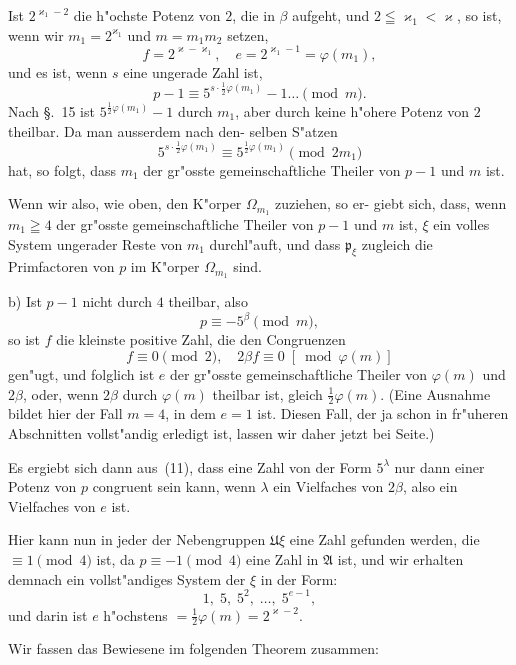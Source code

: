 \documentclass[12pt,a4paper]{article}
\theoremstyle{weber}
\begin{document}
Ist $2^{\varkappa_1-2}$ die h"ochste Potenz von $2$, die in $\beta$ aufgeht, und
$2 \leqq \varkappa_1 < \varkappa$, so ist, wenn wir $m_1 = 2^{\varkappa_1}$ und $m = m_1m_2$ setzen,
\[
f = 2^{\varkappa-\varkappa_1}, \quad e = 2^{\varkappa_1-1} = \varphi(m_1),
\]
und es ist, wenn $s$ eine ungerade Zahl ist,
\[
p - 1 \equiv 5^{s\cdot\frac{1}{2}\varphi(m_1)} - 1 \dots \pmod{m}.
\]
Nach \S.~15 ist $5^{\frac{1}{2}\varphi(m_1)} - 1$ durch $m_1$, aber durch keine
h"ohere Potenz von $2$ theilbar. Da man ausserdem nach den-
selben S"atzen
\[
5^{s\cdot\frac{1}{2}\varphi(m_1)} \equiv 5^{\frac{1}{2}\varphi(m_1)} \pmod{2m_1}
\]
hat, so folgt, dass $m_1$ der gr"osste gemeinschaftliche Theiler von
$p - 1$ und $m$ ist.

Wenn wir also, wie oben, den K"orper $\varOmega_{m_1}$ zuziehen, so er-
giebt sich, dass, wenn $m_1 \geqq 4$ der gr"osste gemeinschaftliche
Theiler von $p - 1$ und $m$ ist, $\xi$ ein volles System ungerader
Reste von $m_1$ durchl"auft, und dass $\mathfrak{p}_\xi$ zugleich die Primfactoren
von $p$ im K"orper $\varOmega_{m_1}$ sind.

b) Ist $p - 1$ nicht durch $4$ theilbar, also
\begin{equation}\label{eq:s172-11}
p \equiv -5^\beta \pmod{m},
\end{equation}
so ist $f$ die kleinste positive Zahl, die den Congruenzen
\[
f \equiv 0 \pmod{2}, \quad 2\beta f \equiv 0 \;\left[\bmod \varphi(m)\right]
\]
gen"ugt, und folglich ist $e$ der gr"osste gemeinschaftliche Theiler
von $\varphi(m)$ und $2\beta$, oder, wenn $2\beta$ durch $\varphi(m)$ theilbar ist,
gleich $\tfrac{1}{2}\varphi(m)$. (Eine Ausnahme bildet hier der Fall $m = 4$, in
dem $e = 1$ ist. Diesen Fall, der ja schon in fr"uheren Abschnitten
vollst"andig erledigt ist, lassen wir daher jetzt bei Seite.)

Es ergiebt sich dann aus~(11), dass eine Zahl von der Form $5^\lambda$
nur dann einer Potenz von $p$ congruent sein kann, wenn $\lambda$ ein
Vielfaches von $2\beta$, also ein Vielfaches von $e$ ist.

Hier kann nun in jeder der Nebengruppen $\mathfrak{U}\xi$ eine Zahl
gefunden werden, die $\equiv 1 \pmod{4}$ ist, da $p \equiv -1 \pmod{4}$
eine Zahl in $\mathfrak{A}$ ist, und wir erhalten demnach ein vollst"andiges
System der $\xi$ in der Form:
\[
1,\; 5,\; 5^2,\; \dots,\; 5^{e-1},
\]
und darin ist $e$ h"ochstens $= \tfrac{1}{2}\varphi(m) = 2^{\varkappa-2}$.

Wir fassen das Bewiesene im folgenden Theorem zusammen:
\end{document}
